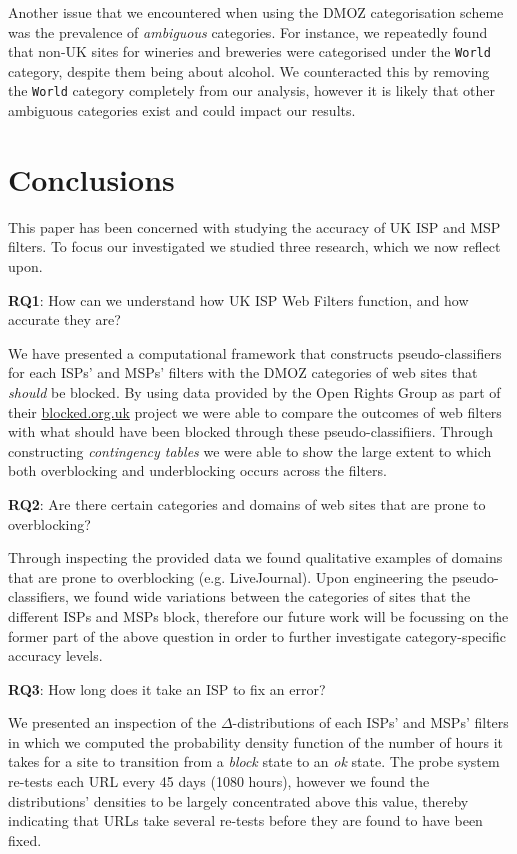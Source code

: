 \documentclass{bmcart}
\begin{document}
Another issue that we encountered when using the DMOZ categorisation scheme was the prevalence of \textit{ambiguous} categories. 
For instance, we repeatedly found that non-UK sites for wineries  and breweries were categorised under the \texttt{World} category, despite them being about alcohol.
We counteracted this by removing the \texttt{World} category completely from our analysis, however it is likely that other ambiguous categories exist and could impact our results.


\section*{Conclusions}
This paper has been concerned with studying the accuracy of UK ISP and MSP filters.
To focus our investigated we studied three research, which we now reflect upon.

\textbf{RQ1}: How can we understand how UK ISP Web Filters function, and how accurate they are?

We have presented a computational framework that constructs pseudo-classifiers for each ISPs' and MSPs' filters with the DMOZ categories of web sites that \textit{should} be blocked.
By using data provided by the Open Rights Group as part of their \url{blocked.org.uk} project we were able to compare the outcomes of web filters with what should have been blocked through these pseudo-classifiiers.
Through constructing \textit{contingency tables} we were able to show the large extent to which both overblocking and underblocking occurs across the filters.

\textbf{RQ2}: Are there certain categories and domains of web sites that are prone to overblocking?

Through inspecting the provided data we found qualitative examples of domains that are prone to overblocking (e.g. LiveJournal).
Upon engineering the pseudo-classifiers, we found wide variations between the categories of sites that the different ISPs and MSPs block, therefore our future work will be focussing on the former part of the above question in order to further investigate category-specific accuracy levels.

\textbf{RQ3}: How long does it take an ISP to fix an error?

We presented an inspection of the $\Delta$-distributions of each ISPs' and MSPs' filters in which we computed the probability density function of the number of hours it takes for a site to transition from a \textit{block} state to an \textit{ok} state.
The probe system re-tests each URL every 45 days (1080 hours), however we found the distributions' densities to be largely concentrated above this value, thereby indicating that URLs take several re-tests before they are found to have been fixed.
\end{document}
